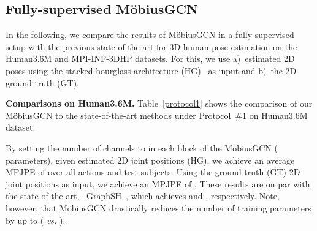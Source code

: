 \documentclass[runningheads]{llncs}
\begin{document}
\vspace{-20px}
\subsection{ Fully-supervised M\"{o}biusGCN}
In the following, we compare the results of M\"obiusGCN in a fully-supervised setup with the previous state-of-the-art for 3D human pose estimation on the Human3.6M and MPI-INF-3DHP datasets. For this, we use a)~estimated 2D poses using the stacked hourglass architecture (HG)~\cite{newell2016stacked} as input and b)~the 2D ground truth (GT).

\textbf{Comparisons on Human3.6M.}
Table~\ref{protocol1} shows the comparison of our M\"obiusGCN to the state-of-the-art methods under Protocol~\#1 on Human3.6M dataset. 

By setting the number of channels to  in each block of the M\"obiusGCN ( parameters), given estimated 2D joint positions (HG), we achieve an average MPJPE of  over all actions and test subjects. Using the ground truth (GT) 2D joint positions as input, we achieve an MPJPE of .
These results are on par with the state-of-the-art, \ie~GraphSH~\cite{xu2021graph}, which achieves  and , respectively.
Note, however, that M\"obiusGCN drastically reduces the number of training parameters by up to  ( \emph{vs.} ).
\end{document}
